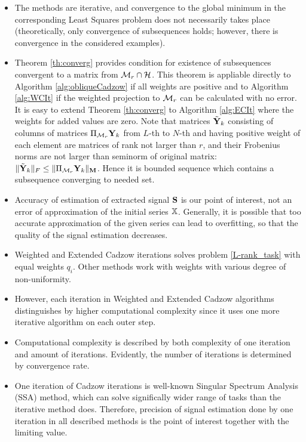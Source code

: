 \documentclass[sii]{ipart}
\begin{document}
	\begin{itemize}
		\item
		The methods are iterative, and convergence to the global minimum in the corresponding Least Squares problem does not necessarily takes place (theoretically, only convergence of subsequences holds; however, there is convergence in the considered examples). %
		\item
		Theorem \ref{th:converg} provides condition for existence of subsequences convergent to a matrix from $\mathcal{M}_r \cap \mathcal{H}$. This theorem is appliable directly to Algorithm \ref{alg:obliqueCadzow} if all weights are positive and to Algorithm \ref{alg:WCIt} if the weighted projection to $\mathcal{M}_r$ can be calculated with no error. It is easy to extend Theorem \ref{th:converg} to Algorithm \ref{alg:ECIt} where the weights for added values are zero. Note that matrices $\tilde {\mathbf{Y}}_k$ consisting of columns of matrices $\Pi_{\mathcal{M}_r} \mathbf{Y}_k$ from $L$-th to $N$-th and having positive weight of each element are matrices of rank not larger than $r$, and their Frobenius norms are not larger than seminorm of original matrix: $\|\tilde {\mathbf{Y}}_k\|_F \le \|\Pi_{\mathcal{M}_r} \mathbf{Y}_k\|_{\mathbf{M}}$. Hence it is bounded sequence which contains a subsequence converging to needed set.
		\item
		Accuracy of estimation of extracted signal $\mathbf{S}$ is our point of interest, not an error of approximation of the initial series $\mathbb{X}$. Generally, it is possible that too accurate approximation of the given series can lead to overfitting, so that the quality of the signal estimation decreases.
		\item
		Weighted and Extended Cadzow iterations solves problem \eqref{L-rank_task} with equal weights $q_i$. Other methods work with weights with various degree of non-uniformity.
		\item
		However, each iteration in Weighted and Extended Cadzow algorithms distinguishes by higher computational complexity since it uses one more iterative algorithm on each outer step.
		\item
		Computational complexity is described by both complexity of one iteration and amount of iterations. Evidently, the number of iterations is determined by convergence rate.
		\item
		One iteration of Cadzow iterations is well-known Singular Spectrum Analysis (SSA) method, which can solve significally wider range of tasks than the iterative method does. Therefore, precision of signal estimation done by one iteration in all described methods is the point of interest together with the limiting value.

\end{itemize}
\end{document}
